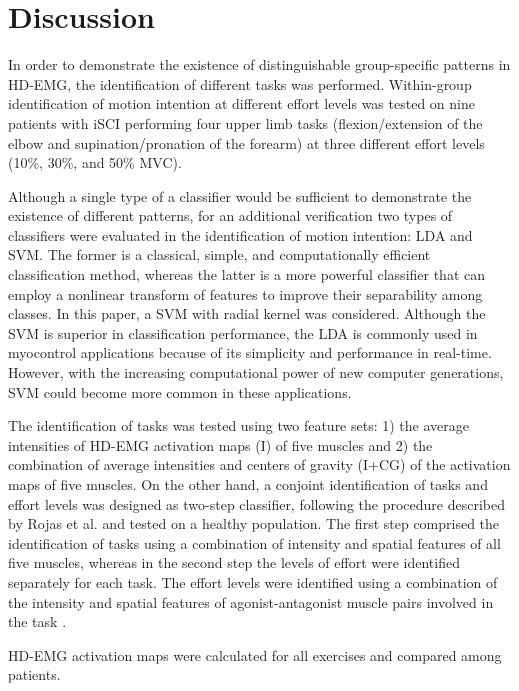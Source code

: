 \section{Discussion}
In order to demonstrate the existence of distinguishable group-specific patterns in HD-EMG, the identification of different tasks was performed. Within-group identification of motion intention at different effort levels was tested on nine patients with iSCI performing four upper limb tasks (flexion/extension of the elbow and supination/pronation of the forearm) at three different effort levels (10\%, 30\%, and 50\% MVC). 

Although a single type of a classifier would be sufficient to demonstrate the existence of different patterns, for an additional verification two types of classifiers were evaluated in the identification of motion intention: LDA and SVM. The former is a classical, simple, and computationally efficient classification method, whereas the latter is a more powerful classifier that can employ a nonlinear transform of features to improve their separability among classes. In this paper, a SVM with radial kernel was considered. Although the SVM is superior in classification performance, the LDA is commonly used in myocontrol applications because of its simplicity and performance in real-time. However, with the increasing computational power of new computer generations, SVM could become more common in these applications. 

The identification of tasks was tested using two feature sets: 1) the average intensities of HD-EMG activation maps (I) of five muscles and 2) the combination of average intensities and centers of gravity (I+CG) of the activation maps of five muscles.
On the other hand, a conjoint identification of tasks and effort levels was designed as two-step classifier, following the procedure described by Rojas et al. \citep{Rojas-Martinez2013} and tested on a healthy population. The first step comprised the identification of tasks using a combination of intensity and spatial features of all five muscles, whereas in the second step the levels of effort were identified separately for each task. The effort levels were identified using a combination of the intensity and spatial features of agonist-antagonist muscle pairs involved in the task \citep{Rojas-Martinez2013}.

HD-EMG activation maps were calculated for all exercises and compared among patients. 

